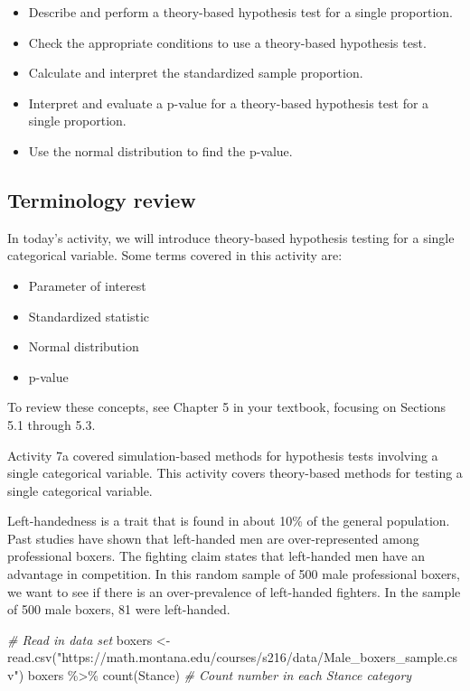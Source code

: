 \documentclass[
]{report}
\newenvironment{Shaded}{\begin{snugshade}}{\end{snugshade}}
\newcommand{\CommentTok}[1]{\textcolor[rgb]{0.56,0.35,0.01}{\textit{#1}}}
\newcommand{\FunctionTok}[1]{\textcolor[rgb]{0.00,0.00,0.00}{#1}}
\newcommand{\NormalTok}[1]{#1}
\newcommand{\OtherTok}[1]{\textcolor[rgb]{0.56,0.35,0.01}{#1}}
\newcommand{\SpecialCharTok}[1]{\textcolor[rgb]{0.00,0.00,0.00}{#1}}
\newcommand{\StringTok}[1]{\textcolor[rgb]{0.31,0.60,0.02}{#1}}
\begin{document}
\begin{itemize}
\item
  Describe and perform a theory-based hypothesis test for a single proportion.
\item
  Check the appropriate conditions to use a theory-based hypothesis test.
\item
  Calculate and interpret the standardized sample proportion.
\item
  Interpret and evaluate a p-value for a theory-based hypothesis test for a single proportion.
\item
  Use the normal distribution to find the p-value.
\end{itemize}

\hypertarget{terminology-review-13}{%
\subsection{Terminology review}\label{terminology-review-13}}

In today's activity, we will introduce theory-based hypothesis testing for a single categorical variable. Some terms covered in this activity are:

\begin{itemize}
\item
  Parameter of interest
\item
  Standardized statistic
\item
  Normal distribution
\item
  p-value
\end{itemize}

To review these concepts, see Chapter 5 in your textbook, focusing on Sections 5.1 through 5.3.

Activity 7a covered simulation-based methods for hypothesis tests involving a single categorical variable. This activity covers theory-based methods for testing a single categorical variable.

Left-handedness is a trait that is found in about 10\% of the general population. Past studies have shown that left-handed men are over-represented among professional boxers. The fighting claim states that left-handed men have an advantage in competition. In this random sample of 500 male professional boxers, we want to see if there is an over-prevalence of left-handed fighters. In the sample of 500 male boxers, 81 were left-handed.

\begin{Shaded}
\begin{Highlighting}[]
 \CommentTok{\# Read in data set}
\NormalTok{boxers }\OtherTok{\textless{}{-}} \FunctionTok{read.csv}\NormalTok{(}\StringTok{"https://math.montana.edu/courses/s216/data/Male\_boxers\_sample.csv"}\NormalTok{)}
\NormalTok{boxers }\SpecialCharTok{\%\textgreater{}\%} \FunctionTok{count}\NormalTok{(Stance)  }\CommentTok{\# Count number in each Stance category}
\end{Highlighting}
\end{Shaded}
\end{document}
